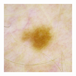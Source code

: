\documentclass[9pt, aspectratio=169]{beamer}
\begin{document}
\begin{frame}
\begin{columns}
\begin{column}{0.25\textwidth}
\begin{figure}
                \caption{\color{gray}{Zeiss - CC-BY 2.0}}
            \end{figure}
        \end{column}
        \begin{column}{0.25\textwidth}
            \begin{figure}
                \includegraphics[height=10em]{ISIC melanoma competition - CC0.png}
                \caption{\color{gray}{ISIC melanoma competition - CC-0}}
            \end{figure}
        \end{column}
    \end{columns}

\end{frame}
\end{document}
